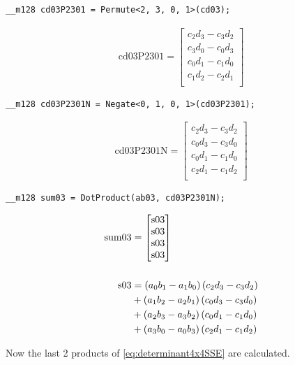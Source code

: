 \begin{verbatim}
__m128 cd03P2301 = Permute<2, 3, 0, 1>(cd03);
\end{verbatim}

\begin{align*}
\mathrm{cd03P2301} 
=
\begin{bmatrix}
c_2d_3 - c_3d_2\\
c_3d_0 - c_0d_3\\
c_0d_1 - c_1d_0\\
c_1d_2 - c_2d_1\\
\end{bmatrix}
\end{align*}

\begin{verbatim}
__m128 cd03P2301N = Negate<0, 1, 0, 1>(cd03P2301);
\end{verbatim}

\begin{align*}
\mathrm{cd03P2301N} 
=
\begin{bmatrix}
c_2d_3 - c_3d_2\\
c_0d_3 - c_3d_0\\
c_0d_1 - c_1d_0\\
c_2d_1 - c_1d_2\\
\end{bmatrix}
\end{align*}

\begin{verbatim}
__m128 sum03 = DotProduct(ab03, cd03P2301N);
\end{verbatim}

\begin{align*}
\mathrm{sum03} 
&=
\begin{bmatrix}
\mathrm{s03}\\
\mathrm{s03}\\
\mathrm{s03}\\
\mathrm{s03}\\
\end{bmatrix}\\
\\
\mathrm{s03}
&= \left(a_0b_1 - a_1b_0\right) \left(c_2d_3 - c_3d_2\right)\\
&+ \left(a_1b_2 - a_2b_1\right) \left(c_0d_3 - c_3d_0\right)\\
&+ \left(a_2b_3 - a_3b_2\right) \left(c_0d_1 - c_1d_0\right)\\
&+ \left(a_3b_0 - a_0b_3\right) \left(c_2d_1 - c_1d_2\right)\\
\end{align*}


Now the last 2 products of \cref{eq:determinant4x4SSE} are calculated.


